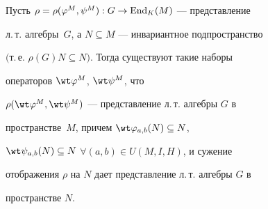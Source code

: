  


 


\begin{prop} 


Пусть $\rho=\rho(\varphi^M,\psi^M):G\to \operatorname{End}_K(M)$ --- представление 


л.\,т. алгебры~$G$, а $N\subseteq M$ --- инвариантное подпространство 


$($т.\,е. $\rho(G)N\subseteq N)$. Тогда существуют такие наборы 


операторов $\wt\varphi{}^M$, $\wt\psi{}^M$, что 


$\rho(\wt\varphi{}^M,\wt\psi{}^M)$ --- представление л.\,т. алгебры $G$ в 


пространстве~$M$, причем $\wt\varphi_{a,b}(N)\subseteq N$, 


$\wt\psi_{a,b}(N)\subseteq N$ $\forall(a,b)\in U(M,I,H)$, и сужение 


отображения $\rho$ на $N$ дает представление л.\,т. алгебры $G$ в 


пространстве $N$.  


\end{prop} 


 


 


